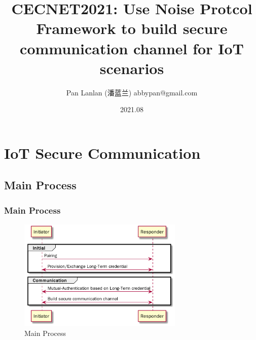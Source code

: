 \documentclass{ctexbeamer}
\title{CECNET2021: Use Noise Protcol Framework to build secure communication channel for IoT scenarios}
\author{Pan Lanlan (潘蓝兰) \newline  \newline abbypan@gmail.com}
\institute[China]{Guangdong OPPO Mobile Telecommunications Corp. Ltd., China}
\date{2021.08}
\begin{document}
\frame{\titlepage}

\frame{\tableofcontents}
\clearpage

\section{IoT Secure Communication}

\subsection{Main Process}
\begin{frame}
\frametitle{Main Process}


    \begin{figure}[H]
        \centering 
        \includegraphics[width=0.7\textwidth]{pic/main_process.png} 
        \caption{Main Process} 
        \label{fig.main_process}
    \end{figure}

\end{frame}
\end{document}
